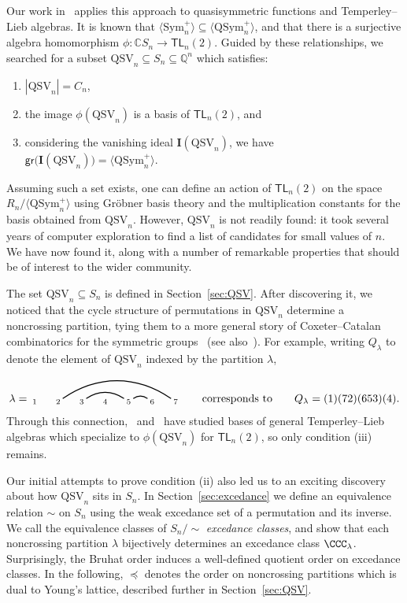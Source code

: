 \documentclass[submission]{FPSAC2024}
\theoremstyle{definition}
\theoremstyle{remark}
\numberwithin{equation}{section}
\newcommand{\CC}{\mathbb{C}}
\newcommand{\QQ}{\mathbb{Q}}
\newcommand{\TL}{\mathsf{TL}}
\newcommand{\Sym}{\mathrm{Sym}}
\newcommand{\QSym}{\mathrm{QSym}}
\newcommand{\QSV}{\mathrm{QSV}}
\begin{document}
Our work in~\cite{BG} applies this approach to quasisymmetric functions and Temperley--Lieb algebras. 
It is known that $\langle \Sym_{n}^{+} \rangle \subseteq \langle \QSym_{n}^{+} \rangle$, and that there is a surjective algebra homomorphism $\phi: \CC S_{n} \to \TL_{n}(2)$. 
Guided by these relationships, we searched for a subset $\QSV_{n} \subseteq S_{n} \subseteq \QQ^{n}$ which satisfies:
\begin{enumerate}[itemsep = -.8ex, label=(\roman*)]
\item $|\QSV_{n}| = C_{n}$,
\item the image $\phi(\QSV_{n})$ is a basis of $\TL_{n}(2)$, and
\item considering the vanishing ideal $\mathbf{I}(\QSV_{n})$, we have $\mathsf{gr}\big(\mathbf{I}(\QSV_{n})\big) = \langle \QSym_{n}^{+} \rangle$.
\end{enumerate}
Assuming such a set exists, one can define an action of $\TL_{n}(2)$ on the space $R_{n}\big/\langle \QSym_{n}^{+} \rangle$ using Gr\"{o}bner basis theory and the multiplication constants for the basis obtained from $\QSV_{n}$.  
However, $\QSV_{n}$ is not readily found: it took several years of computer exploration to find a list of candidates for small values of $n$.  
We have now found it, along with a number of remarkable properties that should be of interest to the wider community.

The set $\QSV_{n} \subseteq S_{n}$ is defined in Section~\ref{sec:QSV}.  
After discovering it, we noticed that the cycle structure of permutations in $\QSV_{n}$ determine a noncrossing partition, tying them to a more general story of Coxeter--Catalan combinatorics for the symmetric groups~\cite{Baine} (see also~\cite{McCammond}).  
For example, writing $Q_{\lambda}$ to denote the element of $\QSV_{n}$ indexed by the partition $\lambda$,
\[
\lambda = \begin{tikzpicture}[scale = 0.75, baseline = 0.75*-0.2]
\foreach \x in {1, ..., 7}{\draw[fill] (\x - 1, 0) node[inner sep = 2pt] (\x) {$\scriptstyle \x$};}
\foreach \i\j in {5/6, 3/5,2/7}{\draw[thick] (\i) to[out = 35, in = 145] (\j);}
\end{tikzpicture}
\qquad\text{corresponds to}\qquad
Q_{\lambda} = (1)(72)(653)(4).
\]
Through this connection,~\cite{Gobet, GW16} and~\cite{Z02} have studied bases of general Temperley--Lieb algebras which specialize to $\phi(\QSV_{n})$ for $\TL_{n}(2)$, so only condition (iii) remains.

Our initial attempts to prove condition (ii) also led us to an exciting discovery about how $\QSV_{n}$ sits in $S_{n}$.  
In Section~\ref{sec:excedance} we define an equivalence relation $\sim$ on $S_{n}$ using the weak excedance set of a permutation and its inverse.  
We call the equivalence classes of $S_{n}\big/\!\!\sim$ \emph{excedance classes}, and show that each noncrossing partition $\lambda$ bijectively determines an excedance class $\CCC_{\lambda}$.  
Surprisingly, the Bruhat order induces a well-defined quotient order on excedance classes.  
In the following, $\preceq$ denotes the order on noncrossing partitions which is dual to Young's lattice, described further in Section~\ref{sec:QSV}.
\end{document}
